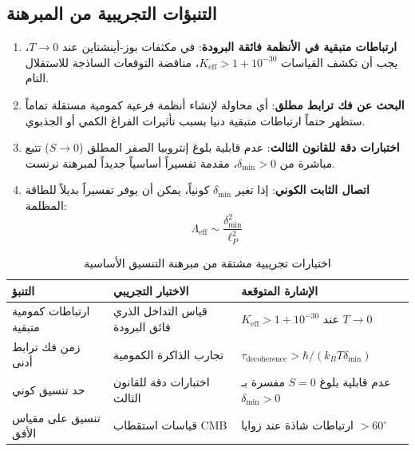 \documentclass[11pt,a4paper]{article}
\begin{document}
	\subsection{التنبؤات التجريبية من المبرهنة}
	
	\begin{enumerate}
		\item \textbf{ارتباطات متبقية في الأنظمة فائقة البرودة}: في مكثفات بوز-أينشتاين عند $T \to 0$، يجب أن تكشف القياسات $K_{\mathrm{eff}} > 1 + 10^{-30}$، مناقضة التوقعات الساذجة للاستقلال التام.
		\item \textbf{البحث عن فك ترابط مطلق}: أي محاولة لإنشاء أنظمة فرعية كمومية مستقلة تماماً ستظهر حتماً ارتباطات متبقية دنيا بسبب تأثيرات الفراغ الكمي أو الجذبوي.
		\item \textbf{اختبارات دقة للقانون الثالث}: عدم قابلية بلوغ إنتروبيا الصفر المطلق ($S \to 0$) تتبع مباشرة من $\delta_{\min} > 0$، مقدمة تفسيراً أساسياً جديداً لمبرهنة نرنست.
		\item \textbf{اتصال الثابت الكوني}: إذا تغير $\delta_{\min}$ كونياً، يمكن أن يوفر تفسيراً بديلاً للطاقة المظلمة:
		\begin{equation}
			\Lambda_{\mathrm{eff}} \sim \frac{\delta_{\min}^2}{\ell_P^2}
		\end{equation}
	\end{enumerate}
	
	\begin{table}[htbp]
		\centering
		\small
		\begin{english}
			\begin{tabular}{p{}p{}p{}}
				\toprule
				\textbf{التنبؤ} & \textbf{الاختبار التجريبي} & \textbf{الإشارة المتوقعة} \\
				\midrule
				ارتباطات كمومية متبقية & قياس التداخل الذري فائق البرودة & $K_{\mathrm{eff}} > 1 + 10^{-30}$ عند $T \to 0$ \\
				زمن فك ترابط أدنى & تجارب الذاكرة الكمومية & $\tau_{\text{decoherence}} > \hbar/(k_B T \delta_{\min})$ \\
				حد تنسيق كوني & اختبارات دقة للقانون الثالث & عدم قابلية بلوغ $S=0$ مفسرة بـ $\delta_{\min}>0$ \\
				تنسيق على مقياس الأفق & قياسات استقطاب CMB & ارتباطات شاذة عند زوايا $>60^\circ$ \\
				\bottomrule
			\end{tabular}
		\end{english}
		\caption{اختبارات تجريبية مشتقة من مبرهنة التنسيق الأساسية}
		\label{tab:theorem-predictions}
	\end{table}
	
\end{document}
